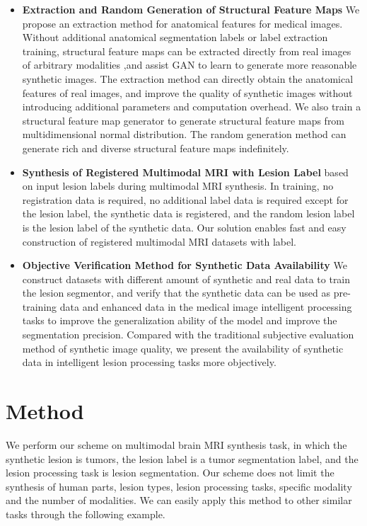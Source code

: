 \documentclass[letterpaper]{article} %
\begin{document}
\begin{itemize}
	\item \textbf{Extraction and Random Generation of Structural Feature Maps}
	We propose an extraction method for anatomical features for medical images. Without additional anatomical segmentation labels or label extraction training, structural feature maps can be extracted directly from real images of arbitrary modalities ,and assist GAN to learn to generate more reasonable synthetic images. The extraction method can directly obtain the anatomical features of real images, and improve the quality of synthetic images without introducing additional parameters and computation overhead. We also train a structural feature map generator to generate structural feature maps from multidimensional normal distribution. The random generation method can generate rich and diverse structural feature maps indefinitely.
	\item \textbf{Synthesis of Registered Multimodal MRI with Lesion Label}
	based on input lesion labels during multimodal MRI synthesis. In training, no registration data is required, no additional label data is required except for the lesion label, the synthetic data is registered, and the random lesion label is the lesion label of the synthetic data. Our solution enables fast and easy construction of registered multimodal MRI datasets with label.
	\item \textbf{Objective Verification Method for Synthetic Data Availability}
	We construct datasets with different amount of synthetic and real data to train the lesion segmentor, and verify that the synthetic data can be used as pre-training data and enhanced data in the medical image intelligent processing tasks to improve the generalization ability of the model and improve the segmentation precision. Compared with the traditional subjective evaluation method of synthetic image quality, we present the availability of synthetic data in intelligent lesion processing tasks more objectively.
\end{itemize}


\section{Method}
\label{method}
We perform our scheme on multimodal brain MRI synthesis task, in which the synthetic lesion is tumors, the lesion label is a tumor segmentation label, and the lesion processing task is lesion segmentation. Our scheme does not limit the synthesis of human parts, lesion types, lesion processing tasks, specific modality and the number of modalities. We can easily apply this method to other similar tasks through the following example.
\end{document}
